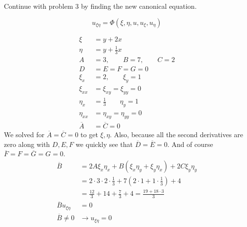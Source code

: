 \documentclass{article}
\begin{document}
Continue with problem 3 by finding the new canonical equation.

\[u_{\xi\eta}=\Phi(\xi,\eta,u,u_\xi,u_\eta)\]

\begin{align*}
  \xi&=y+2x\\
  \eta&=y+\frac{1}{3}x\\
  A&=3,\qquad
  B=7,\qquad
  C=2\\
  D&=E=F=G=0\\
  \xi_x&=2,\qquad \xi_y=1\\
  \xi_{xx}&=\xi_{xy}=\xi_{yy}=0\\
  \eta_x&=\frac{1}{3}\qquad\eta_y=1\\
  \eta_{xx}&=\eta_{xy}=\eta_{yy}=0\\
  \overline{A}&=\overline{C}=0
\end{align*}
We solved for $\overline{A}=\overline{C}=0$ to get $\xi,\eta$. Also, because all the second derivatives are zero along with $D,E,F$ we quickly see that $\overline{D}=\overline{E}=0$. And of course $\overline{F}=F=\overline{G}=G=0$.
\begin{align*}
  \overline{B}&=2A\xi_x\eta_x+B(\xi_x\eta_y+\xi_y\eta_x)+2C\xi_y\eta_y\\
  &=2\cdot3\cdot2\cdot\frac{1}{3}+7\left(2\cdot1+1\cdot\frac{1}{3}\right)+4\\
  &=\frac{12}{3}+14+\frac{7}{3}+4=\frac{19+18\cdot3}{3}\\
  \overline{B}u_{\xi\eta}&=0\\
  \overline{B}\ne0&\to u_{\xi\eta}=0
\end{align*}
\end{document}
